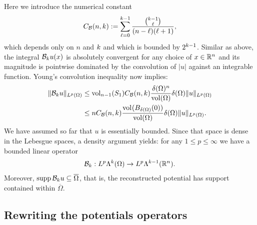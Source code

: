 \documentclass[10pt,a4paper]{article}
\begin{document}
Here we introduce the numerical constant 
\begin{gather}\label{equation:A_Bogov}
    C_{{\mathcal B}}(n,k) := \sum_{\ell=0}^{k-1} \frac{ \tbinom{k-1}{\ell} }{ (n-\ell)(\ell+1) }, 
\end{gather}
which depends only on $n$ and $k$ and which is bounded by $2^{k-1}$. 
Similar as above,
the integral ${\mathcal B}_{k} u(x)$ is absolutely convergent for any choice of $x \in {\mathbb R}^{n}$
and its magnitude is pointwise dominated by the convolution of $|u|$ against an integrable function.
Young's convolution inequality now implies: 
\begin{align*}
    \| {\mathcal B}_{k} u \|_{L^{p}(\Omega)}
    &
    \leq 
    \operatorname{vol}_{n-1}(S_1) C_{{\mathcal B}}(n,k) \frac{ {\delta}(\Omega)^{n} }{\operatorname{vol}(\Omega)} 
    {\delta}(\Omega)
    \| u \|_{L^{p}(\Omega)}
    \\&
    \leq 
    n C_{{\mathcal B}}(n,k) \frac{ \operatorname{vol}_{}(B_{{\delta}(\Omega)}(0)) }{\operatorname{vol}(\Omega)} 
    {\delta}(\Omega)
    \| u \|_{L^{p}(\Omega)}
    .
\end{align*}
We have assumed so far that $u$ is essentially bounded.
Since that space is dense in the Lebesgue spaces, a density argument yields: 
for any $1 \leq p \leq \infty$ we have a bounded linear operator 
\begin{gather*}
    {\mathcal B}_{k} : L^{p}\Lambda^{k}(\Omega) \rightarrow L^{p}\Lambda^{k-1}({\mathbb R}^n).
\end{gather*}
Moreover, $\operatorname{supp} {\mathcal B}_{k} u \subseteq \overline\Omega$,
that is, the reconstructed potential has support contained within $\overline\Omega$. 
\\





\color{blue}
\subsection{Rewriting the potentials operators}
\end{document}
